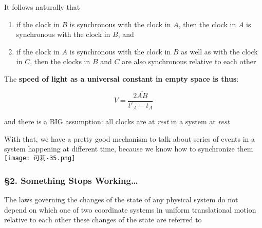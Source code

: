 It follows naturally that

\begin{enumerate}
    \item if the clock in $B$ is synchronous with the clock in $A$, then the clock in $A$ is synchronous with the clock
          in $B$, and
    \item if the clock in $A$ is synchronous with the clock in $B$ as well as with the clock in $C$, then the clocks in
          $B$ and $C$ are also synchronous relative to each other
\end{enumerate}

The \textbf{speed of light as a universal constant in empty space is thus}:

\begin{tcolorbox}[enhanced,colframe=green!75!black,colback=green!5!white]
    \begin{equation}
        V = \frac{2\overline{AB}}{t'_A - t_A}
    \end{equation}
\end{tcolorbox}

\begin{marker}
    and there is a BIG assumption: all clocks are at \textit{rest} in a system at \textit{rest}
\end{marker}

With that, we have a pretty good mechanism to talk about series of events in a system happening at different time,
because we know how to synchronize them \texttt{[image: 可莉-35.png]}

\subsubsection{\hfil \S2. Something Stops Working\ldots \hfil}

\begin{tcolorbox}[
    enhanced,
    title=Principle of Relativity,
    colframe=green!50!black,
    colback=green!10!white,
    arc=0mm,
    colbacktitle=red!10!white,
    coltitle=green!50!black,
    attach boxed title to top text right={yshift=-0.50mm},
    boxed title style={
        skin=enhancedfirst jigsaw,
        size=small,arc=1mm,bottom=-1mm,
        interior style={fill=none, top color=green!30!white, bottom color=green!20!white}
    }
]
    The laws governing the changes of the state of any physical system do not depend on which one of two coordinate
    systems in uniform translational motion relative to each other these changes of the state are referred to
\end{tcolorbox}

